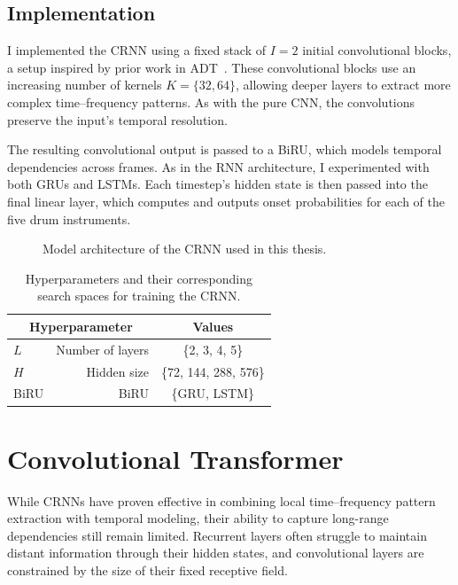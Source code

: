 \subsection{Implementation}

I implemented the \gls{CRNN} using a fixed stack of $I = 2$ initial convolutional blocks, a setup inspired by prior work in \gls{ADT}~\cite{Vogl2017DrumTV, signals4040042}. These convolutional blocks use an increasing number of kernels $K = \{32, 64\}$, allowing deeper layers to extract more complex time–frequency patterns. As with the pure \gls{CNN}, the convolutions preserve the input's temporal resolution.

The resulting convolutional output is passed to a \gls{BiRU}, which models temporal dependencies across frames. As in the \gls{RNN} architecture, I experimented with both \glspl{GRU} and \glspl{LSTM}. Each timestep's hidden state is then passed into the final linear layer, which computes and outputs onset probabilities for each of the five drum instruments.

\begin{figure}[H]
    \centering
    
    \caption{Model architecture of the \acrlong{CRNN} used in this thesis.}
    \label{CRNNFigure}
\end{figure}

\begin{table}[H]
    \centering
    \begin{tabular}{lr|c}
        \multicolumn{2}{c|}{Hyperparameter} & Values       \\
        \hline
        $L$ & Number of layers      & \{2, 3, 4, 5\} \\
        $H$ & Hidden size      & \{72, 144, 288, 576\} \\
        \gls{BiRU} & \acrlong{BiRU} & \{\gls{GRU}, \gls{LSTM}\}\\
    \end{tabular}
    \caption{Hyperparameters and their corresponding search spaces for training the \acrlong{CRNN}.}
    \label{CRNNHyperparams}
\end{table}

\section{Convolutional Transformer}

While \glspl{CRNN} have proven effective in combining local time–frequency pattern extraction with temporal modeling, their ability to capture long-range dependencies still remain limited. Recurrent layers often struggle to maintain distant information through their hidden states, and convolutional layers are constrained by the size of their fixed receptive field.

